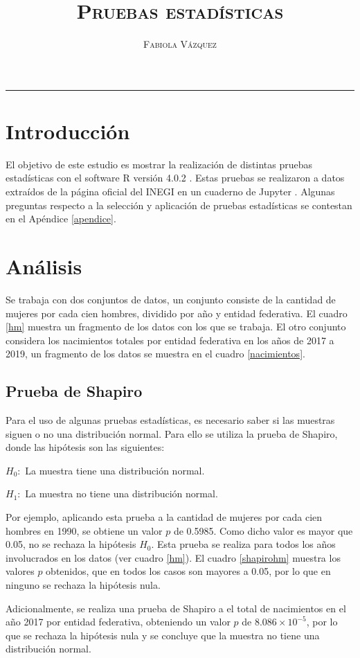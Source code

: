 \documentclass[12pt,letterpaper]{article}
\title{\textsc{Pruebas estadísticas}}
\author{\textsc{Fabiola Vázquez}}
\begin{document}
\maketitle

\hrule
\section{Introducción}
El objetivo de este estudio es mostrar la realización de distintas pruebas estadísticas \cite{statisticsr} con el software R versión 4.0.2 \cite{R}. Estas pruebas se realizaron a datos extraídos de la página oficial del INEGI \cite{inegi} en un cuaderno de Jupyter \cite{jupyter}. Algunas preguntas respecto a la selección y aplicación de pruebas estadísticas se contestan en el Apéndice \ref{apendice}. 

\section{Análisis}
Se trabaja con dos conjuntos de datos, un conjunto consiste de la cantidad de mujeres por cada cien hombres, dividido por año y entidad federativa. El cuadro \ref{hm} muestra un fragmento de los datos con los que se trabaja. El otro conjunto considera los nacimientos totales por entidad federativa en los años de 2017 a 2019, un fragmento de los datos se muestra en el cuadro \ref{nacimientos}. 

\subsection{Prueba de Shapiro}
Para el uso de algunas pruebas estadísticas, es necesario saber si las muestras siguen o no una distribución normal. Para ello se utiliza la prueba de Shapiro, donde las hipótesis son las siguientes: 
\begin{center}
$H_0:$ La muestra tiene una distribución normal.

$H_1:$ La muestra no tiene una distribución normal.
\end{center}
Por ejemplo, aplicando esta prueba a la cantidad de mujeres por cada cien hombres en 1990, se obtiene un valor $p$ de 0.5985. Como dicho valor es mayor que 0.05, no se rechaza la hipótesis $H_0$. Esta prueba se realiza para todos los años involucrados en los datos (ver cuadro \ref{hm}). El cuadro \ref{shapirohm} muestra los valores $p$ obtenidos, que en todos los casos son mayores a 0.05, por lo que en ninguno se rechaza la hipótesis nula. 

Adicionalmente, se realiza una prueba de Shapiro a el total de nacimientos en el año 2017 por entidad federativa, obteniendo un valor $p$ de $8.086\times 10^{-5}$, por lo que se rechaza la hipótesis nula y se concluye que la muestra no tiene una distribución normal. 
\end{document}
